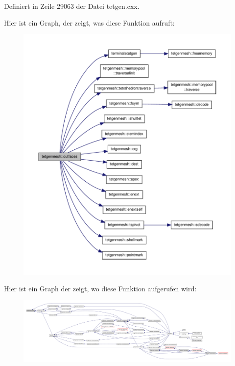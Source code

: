 Definiert in Zeile 29063 der Datei tetgen.\-cxx.



Hier ist ein Graph, der zeigt, was diese Funktion aufruft\-:\nopagebreak
\begin{figure}[H]
\begin{center}
\leavevmode
\includegraphics[width=350pt]{classtetgenmesh_a66e4aa0af0703d1cb1a88e6d5f5a7fe6_cgraph}
\end{center}
\end{figure}




Hier ist ein Graph der zeigt, wo diese Funktion aufgerufen wird\-:\nopagebreak
\begin{figure}[H]
\begin{center}
\leavevmode
\includegraphics[width=350pt]{classtetgenmesh_a66e4aa0af0703d1cb1a88e6d5f5a7fe6_icgraph}
\end{center}
\end{figure}


